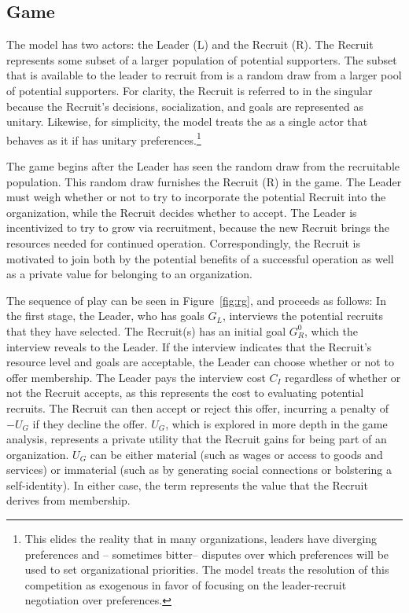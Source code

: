 \subsection{Game}

The model has two actors: the Leader (L) and the Recruit (R). The Recruit represents some subset of a larger population of potential supporters. The subset that is available to the leader to recruit from is a random draw from a larger pool of potential supporters. For clarity, the Recruit is referred to in the singular because the Recruit's decisions, socialization, and goals are represented as unitary. Likewise, for simplicity, the model treats the  as a single actor that behaves as it if has unitary preferences.\footnote{This elides the reality that in many organizations, leaders have diverging preferences and -- sometimes bitter-- disputes over which preferences will be used to set organizational priorities. The model treats the resolution of this competition as exogenous in favor of focusing on the leader-recruit negotiation over preferences. }

The game begins after the Leader has seen the random draw from the recruitable population. This random draw furnishes the Recruit (R) in the game. The Leader must weigh whether or not to try to incorporate the potential Recruit into the organization, while the Recruit decides whether to accept.  The Leader is incentivized to try to grow via recruitment, because the new Recruit brings the resources needed for continued operation. Correspondingly, the Recruit is motivated to join both by the potential benefits of a successful operation as well as a private value for belonging to an organization.

The sequence of play can be seen in Figure~\ref{fig:rg}, and proceeds as follows: In the first stage, the Leader, who has goals $G_{L}$, interviews the potential recruits that they have selected. The Recruit(s) has an initial goal $G^{0}_{R}$, which the interview reveals to the Leader. If the interview indicates that the Recruit's resource level and goals are acceptable, the Leader can choose whether or not to offer membership. The Leader pays the interview cost $C_{I}$ regardless of whether or not the Recruit accepts, as this represents the cost to evaluating potential recruits.
The Recruit can then accept or reject this offer, incurring a penalty of $-U_{G}$ if they decline the offer.  $U_{G}$, which is explored in more depth in the game analysis, represents a private utility that the Recruit gains for being part of an organization. $U_{G}$ can be either material (such as wages or access to goods and services) or immaterial (such as by generating social connections or bolstering a self-identity). In either case, the term represents the value that the Recruit derives from membership.

